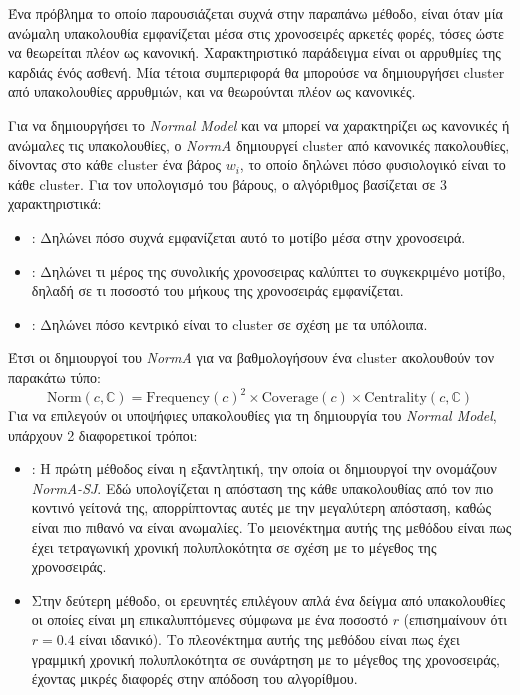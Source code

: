 Ένα πρόβλημα το οποίο παρουσιάζεται συχνά στην παραπάνω μέθοδο, είναι όταν μία ανώμαλη υπακολουθία εμφανίζεται μέσα στις χρονοσειρές αρκετές φορές, τόσες ώστε να θεωρείται πλέον ως κανονική. Χαρακτηριστικό παράδειγμα είναι οι αρρυθμίες της καρδιάς ένός ασθενή. Μία τέτοια συμπεριφορά θα μπορούσε να δημιουργήσει cluster από υπακολουθίες αρρυθμιών, και να θεωρούνται πλέον ως κανονικές.

Για να δημιουργήσει το \emph{Normal Model} και να μπορεί να χαρακτηρίζει ως κανονικές ή ανώμαλες τις υπακολουθίες, ο \emph{NormA} δημιουργεί cluster από κανονικές πακολουθίες, δίνοντας στο κάθε cluster ένα βάρος $w_i$, το οποίο δηλώνει πόσο φυσιολογικό είναι το κάθε cluster. Για τον υπολογισμό του βάρους, ο αλγόριθμος βασίζεται σε 3 χαρακτηριστικά:
\begin{itemize}
    \item \emph{}: Δηλώνει πόσο συχνά εμφανίζεται αυτό το μοτίβο μέσα στην χρονοσειρά.
    \item \emph{}: Δηλώνει τι μέρος της συνολικής χρονοσειρας καλύπτει το συγκεκριμένο μοτίβο, δηλαδή σε τι ποσοστό του μήκους της χρονοσειράς εμφανίζεται.
    \item \emph{}: Δηλώνει πόσο κεντρικό είναι το cluster σε σχέση με τα υπόλοιπα.
\end{itemize}
Έτσι οι δημιουργοί του \emph{NormA} για να βαθμολογήσουν ένα cluster ακολουθούν τον παρακάτω τύπο:
\[
\text{Norm}(c,\mathbb{C}) = \text{Frequency}(c)^2 \times \text{Coverage}(c) \times \text{Centrality}(c,\mathbb{C})
\]
Για να επιλεγούν οι υποψήφιες υπακολουθίες για τη δημιουργία του \emph{Normal Model}, υπάρχουν 2 διαφορετικοί τρόποι: 
\begin{itemize}
    \item \emph{}: H πρώτη μέθοδος είναι η εξαντλητική, την οποία οι δημιουργοί την ονομάζουν \emph{NormA-SJ}. Εδώ υπολογίζεται η απόσταση της κάθε υπακολουθίας από τον πιο κοντινό γείτονά της, απορρίπτοντας αυτές με την μεγαλύτερη απόσταση, καθώς είναι πιο πιθανό να είναι ανωμαλίες. Το μειονέκτημα αυτής της μεθόδου είναι πως έχει τετραγωνική χρονική πολυπλοκότητα σε σχέση με το μέγεθος της χρονοσειράς.
    \item \emph{} Στην δεύτερη μέθοδο, οι ερευνητές επιλέγουν απλά ένα δείγμα από υπακολουθίες οι οποίες είναι μη επικαλυπτόμενες σύμφωνα με ένα ποσοστό $r$ (επισημαίνουν ότι $r=0.4$ είναι ιδανικό). Το πλεονέκτημα αυτής της μεθόδου είναι πως έχει γραμμική χρονική πολυπλοκότητα σε συνάρτηση με το μέγεθος της χρονοσειράς, έχοντας μικρές διαφορές στην απόδοση του αλγορίθμου. 
\end{itemize}

